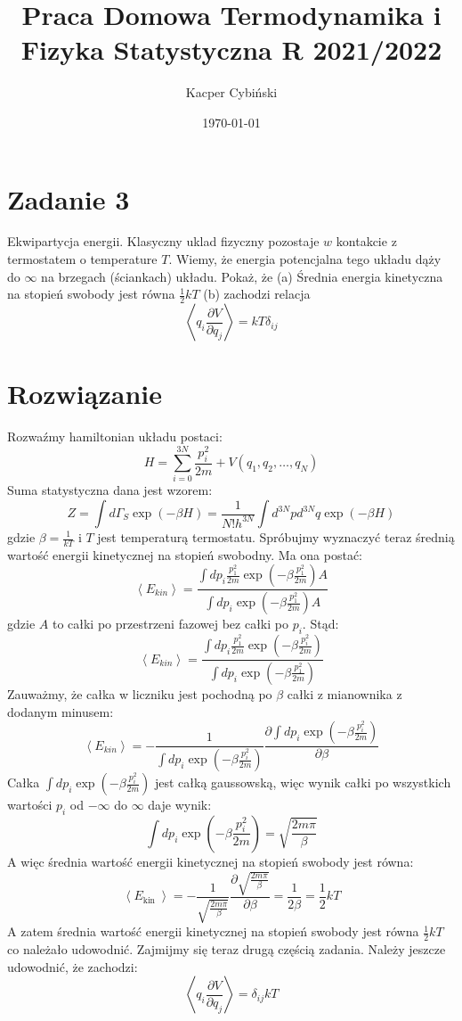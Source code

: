 \documentclass[12pt,a4paper]{article}
\title{Praca Domowa Termodynamika i Fizyka Statystyczna R 2021/2022}
\author{Kacper Cybiński}
\date{\today}
\begin{document}
\maketitle

\section{Zadanie 3}

Ekwipartycja energii. Klasyczny uklad fizyczny pozostaje $w$ kontakcie z termostatem o temperature $T$. Wiemy, że energia potencjalna tego układu dąży do $\infty$ na brzegach (ściankach) układu. Pokaż, że
(a) Średnia energia kinetyczna na stopień swobody jest równa $\frac{1}{2} k T$
(b) zachodzi relacja
$$
\left\langle q_{i} \frac{\partial V}{\partial q_{j}}\right\rangle=k T \delta_{i j}
$$


\section{Rozwiązanie}

Rozwaźmy hamiltonian układu postaci:
$$
H=\sum_{i=0}^{3 N} \frac{p_{i}^{2}}{2 m}+V\left(q_{1}, q_{2}, \ldots, q_{N}\right)
$$
Suma statystyczna dana jest wzorem:
$$
Z=\int d \Gamma_{S} \exp (-\beta H)=\frac{1}{N ! h^{3 N}} \int d^{3 N} p d^{3 N} q \exp (-\beta H)
$$
gdzie $\beta=\frac{1}{k T}$ i $T$ jest temperaturą termostatu. Spróbujmy wyznaczyć teraz średnią wartość energii kinetycznej na stopień swobodny. Ma ona postać:
$$
\left\langle E_{k i n}\right\rangle=\frac{\int d p_{i} \frac{p_{1}^{2}}{2 m} \exp \left(-\beta \frac{p_{1}^{2}}{2 m}\right) A}{\int d p_{i} \exp \left(-\beta \frac{p_{1}^{2}}{2 m}\right) A}
$$
gdzie $A$ to całki po przestrzeni fazowej bez całki po $p_{i}$. Stąd:
$$
\left\langle E_{k i n}\right\rangle=\frac{\int d p_{i} \frac{p_{1}^{2}}{2 m} \exp \left(-\beta \frac{p_{i}^{2}}{2 m}\right)}{\int d p_{i} \exp \left(-\beta \frac{p_{1}^{2}}{2 m}\right)}
$$
Zauważmy, że całka w liczniku jest pochodną po $\beta$ całki z mianownika z dodanym minusem:
$$
\left\langle E_{k i n}\right\rangle=-\frac{1}{\int d p_{i} \exp \left(-\beta \frac{p_{i}^{2}}{2 m}\right)} \frac{\partial \int d p_{i} \exp \left(-\beta \frac{p_{i}^{2}}{2 m}\right)}{\partial \beta}
$$
Całka $\int d p_{i} \exp \left(-\beta \frac{p_{i}^{2}}{2 m}\right)$ jest całką gaussowską, więc wynik całki po wszystkich wartości $p_{i}$ od $-\infty$ do $\infty$ daje wynik:
$$
\int d p_{i} \exp \left(-\beta \frac{p_{i}^{2}}{2 m}\right)=\sqrt{\frac{2 m \pi}{\beta}}
$$
A więc średnia wartość energii kinetycznej na stopień swobody jest równa:
$$
\left\langle E_{\text {kin }}\right\rangle=-\frac{1}{\sqrt{\frac{2 m \pi}{\beta}}} \frac{\partial \sqrt{\frac{2 m \pi}{\beta}}}{\partial \beta}=\frac{1}{2 \beta}=\frac{1}{2} k T
$$
A zatem średnia wartość energii kinetycznej na stopień swobody jest równa $\frac{1}{2} k T$ co należało udowodnić.
Zajmijmy się teraz drugą częścią zadania. Należy jeszcze udowodnić, że zachodzi:
$$
\left\langle q_{i} \frac{\partial V}{\partial q_{j}}\right\rangle=\delta_{i j} k T
$$
\end{document}
